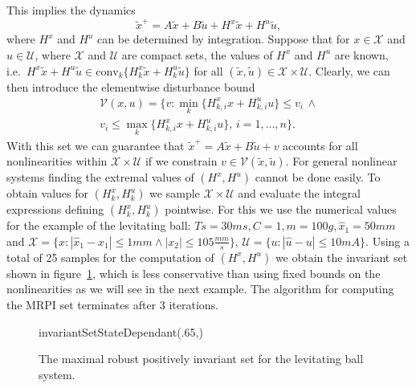 \documentclass[letterpaper, 10pt, conference]{ieeeconf} %
\providecommand{\abs}[1]{\left|#1\right|}
\providecommand{\conv}{\text{conv}}
\begin{document}
%
This implies the dynamics
\[
\tilde x^+ = A\tilde x+B\tilde u + H^x\tilde x + H^u \tilde u, 
\]
where
$H^x$ and $H^u$ can be determined by integration. Suppose that
for $x\in\mathcal X$ and $u\in\mathcal U$, where $\mathcal X$ and $\mathcal U$ are compact
sets, the values of $H^x$ and $H^u$ are known, i.e.\
$H^x\tilde x+H^u\tilde u\in\conv_k\{H^x_k\tilde x + H^u_k\tilde u\}$ for all $(\tilde x,\tilde u)\in\mathcal X\times \mathcal U$.
Clearly, we can then introduce the element\-wise disturbance bound 
%
\begin{multline}\label{eq:definition:element:wise:constraints:on:nonlinearities}
\mathcal V(x,u)=\biggl\{v:\min_k\{
H^x_{k,i}x+H^u_{k,i}u\}\leq v_i\,\wedge 
\\ 
v_i \leq \max_k\{H^x_{k,i}x+H^u_{k,i}u\}, \, i =1,\dots,n\biggr\}.
\end{multline}
%
With this set we can
guarantee that $\tilde x^+ = A\tilde x + B\tilde u + v$ accounts for all nonlinearities within $\mathcal X
\times\mathcal U$ if we constrain $v\in\mathcal V(\tilde x,\tilde u)$. For general nonlinear systems
finding the extremal values of $(H^x,H^u)$ cannot be done easily.
To obtain values for $(H^x_k,H^u_k)$ we sample $\mathcal X\times\mathcal U$ and evaluate the integral 
expressions defining $(H^x_k,H^u_k)$ pointwise. For this we use the numerical values for the example of the 
levitating ball: $Ts=30ms, C=1, m=100g, \hat x_1 = 50mm$ and $\mathcal X=\{x:
\abs{\hat x_1-x_1}\leq 1mm\wedge \abs{x_2}\leq 105\frac{mm}{s}\}$, $\mathcal U=\{u:\abs{\hat u-u}\leq10mA\}$.
Using a total of 25 samples for the computation of $(H^x,H^u)$ we obtain the invariant set shown in figure~\ref{fig:MRPI:set:levitating:ball},
which is less conservative than using fixed bounds on the nonlinearities as we will see in the next example.
The algorithm for computing the MRPI set terminates after 3 iterations.
%
%
\begin{figure}
\centering
\begin{lpic}{invariantSetStateDependant(.65,)}
{\tiny
{}
}
{\small
{}
}
\end{lpic}
\caption{The maximal robust positively invariant set for the levitating ball system.}
\label{fig:MRPI:set:levitating:ball}
\end{figure}
%
%
%
%
%
\end{document}
